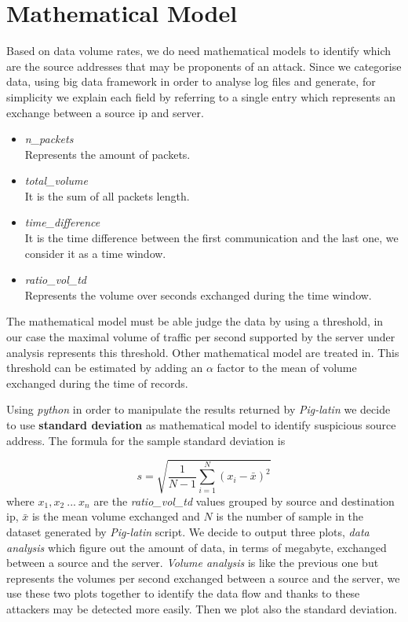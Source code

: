 \section{Mathematical Model}
Based on data volume rates, we do need mathematical models to identify which are the source addresses that may be proponents of an attack. Since we categorise data, using big data framework in order to analyse log files and generate, for simplicity we explain each field by referring to a single entry which represents an exchange between a source ip and server.

\begin{itemize}
	\item \textit{n\_packets} \\ Represents the amount of packets.
	\item \textit{total\_volume} \\ It is the sum of all packets length.
	\item \textit{time\_difference} \\ It is the time difference between the first communication and the last one, we consider it as a time window.
	\item \textit{ratio\_vol\_td} \\ Represents the volume over seconds exchanged during the time window.
\end{itemize}

The mathematical model must be able judge the data by using a threshold, in our case the maximal volume of traffic per second supported by the server under analysis represents this threshold. Other mathematical model are treated in\cite{detection_by_path_analaysis}. 
This threshold can be estimated by adding an $\alpha$ factor to the mean of volume exchanged during the time of records.

Using \textit{python} in order to manipulate the results returned by \textit{Pig-latin} we decide to use \textbf{standard deviation} as mathematical model to identify suspicious source address.
The formula for the sample standard deviation is

\begin{equation}
\label{eq:standard_dev}
	s = \sqrt{\frac{1}{N-1}\sum_{i=1}^N(x_i - \bar{x})^2}
\end{equation}
where $x_1, x_2\ ...\ x_n$ are the \textit{ratio\_vol\_td} values grouped by source and destination ip, $\bar{x}$ is the mean volume exchanged and $N$ is the number of sample in the dataset generated by \textit{Pig-latin} script. We decide to output three plots, \textit{data analysis} which figure out the amount of data, in terms of megabyte, exchanged between a source and the server. \textit{Volume analysis} is like the previous one but represents the volumes per second exchanged between a source and the server, we use these two plots together to identify the data flow and thanks to these attackers may be detected more easily. Then we plot also the standard deviation.
